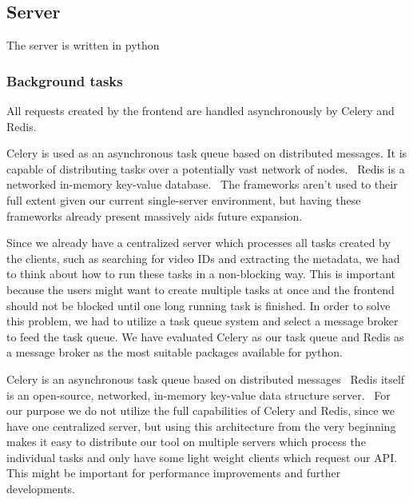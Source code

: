 

\subsection{Server}
The server is written in python %


\subsubsection{Background tasks}
All requests created by the frontend are handled asynchronously by Celery and
Redis.

Celery is used as an asynchronous task queue based on distributed messages. It
is capable of distributing tasks over a potentially vast network of nodes.~\cite{architecture:celery}
Redis is a networked in-memory key-value database.~\cite{architecture:redis}
The frameworks aren't used to their full extent given our current
single-server environment, but having these frameworks already present massively
aids future expansion.


Since we already have a centralized server which processes all tasks created by the clients, such as searching for 
video IDs and extracting the metadata, we had to think about how to run these tasks in a non-blocking way.
This is important
because the users might want to create multiple tasks at once and the frontend should not be blocked until one long running task
is finished. In order to solve this problem, we had to utilize a task queue system and select a message broker to feed the task queue.
We have evaluated Celery as our task queue and Redis as a message broker as the most suitable packages available for python.

Celery is an asynchronous task queue based on distributed messages~\cite{architecture:celery}
Redis itself is an open-source, networked, in-memory key-value data structure server.~\cite{architecture:redis} For our
purpose we do not utilize the full capabilities of Celery and Redis, since we have one centralized server, but using
this architecture from the very beginning makes it easy to distribute our tool on multiple servers which process the individual tasks and only
have some light weight clients which request our API.
This might be important for performance improvements and further developments.

